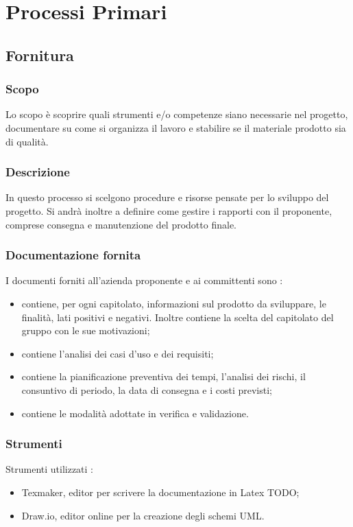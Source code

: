 \section{Processi Primari}
\subsection{Fornitura}
\subsubsection{Scopo}
Lo scopo è scoprire quali strumenti e/o competenze siano necessarie nel progetto, documentare su come si organizza il lavoro e stabilire se il materiale prodotto sia di qualità.

\subsubsection{Descrizione}
In questo processo si scelgono procedure e risorse pensate per lo sviluppo del progetto. Si andrà inoltre a definire come gestire i rapporti con il proponente, comprese consegna e manutenzione del prodotto finale.

\subsubsection{Documentazione fornita}
I documenti forniti all’azienda proponente e ai committenti sono :
\begin{itemize}
  \item \textbf{\SdF} contiene, per ogni capitolato, informazioni sul prodotto da sviluppare, le finalità, lati positivi e negativi. Inoltre contiene la scelta del capitolato del gruppo con le sue motivazioni;

  \item \textbf{\AdR} contiene l’analisi dei casi d’uso e dei requisiti;

  \item \textbf{\PdP} contiene la pianificazione preventiva dei tempi, l’analisi dei rischi, il consuntivo di periodo, la data di consegna e i costi previsti;

  \item \textbf{\PdQ} contiene le modalità adottate in verifica e validazione.

\end{itemize}
\subsubsection{Strumenti}
Strumenti utilizzati :
\begin{itemize}
  \item Texmaker, editor per scrivere la documentazione in Latex TODO;
  \item Draw.io,  editor online per la creazione degli schemi UML.
\end{itemize}

